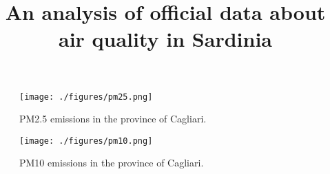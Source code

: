 \documentclass[a4paper]{article}
\begin{document}
\title{An analysis of official data about air quality in Sardinia}
\maketitle

\begin{figure}
\centering
\texttt{[image: ./figures/pm25.png]}
\caption{PM2.5 emissions in the province of Cagliari.}
\label{fig:pm25-all}
\end{figure}

\begin{figure}
\centering
\texttt{[image: ./figures/pm10.png]}
\caption{PM10 emissions in the province of Cagliari.}
\label{fig:pm25-all}
\end{figure}
\end{document}
